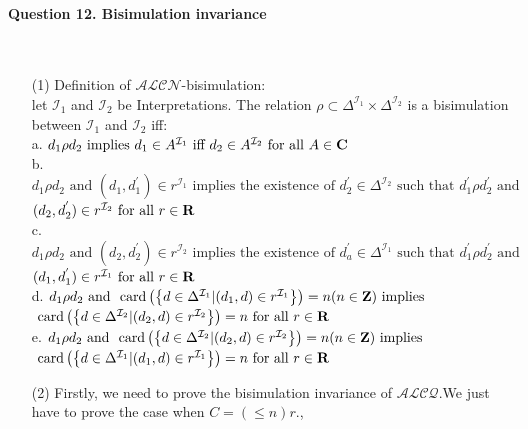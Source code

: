 \documentclass[12pt]{article}
\begin{document}
    \paragraph{Question 12. Bisimulation invariance}~{}
    \\
    
    \begin{enumerate}
        \item[(1)]
        Definition of $\mathcal{ALCN}$-bisimulation: \\
        let $\mathcal{I}_1$ and $\mathcal{I}_2$ be Interpretations. The relation $\rho \subset \Delta^{\mathcal{I}_1}\times \Delta^{\mathcal{I}_2}$ is a bisimulation between $\mathcal{I}_1$ and $\mathcal{I}_2$ iff: \\
        a. $d_1 \rho d_2 \text{ implies } d_1 \in A^{\mathcal{I}_1} \text{ iff } d_2 \in A^{\mathcal{I}_2} \text{ for all } A \in \bold{C}$ \\
        b. $d_1 \rho d_2 \text{ and } (d_1, d_1^{'}) \in r^{\mathcal{I}_1} \text{ implies the existence of } d_2^{'} \in \Delta^{\mathcal{I}_2} \text{ such that } d_1^{'} \rho d_2^{'} \text{ and } $ \\
        $(d_2, d_2^{'})\in r^{\mathcal{I}_2} \text{ for all }r \in \bold{R}$ \\
        c. $d_1 \rho d_2 \text{ and } (d_2, d_2^{'}) \in r^{\mathcal{I}_2} \text{ implies the existence of } d_a^{'} \in \Delta^{\mathcal{I}_1} \text{ such that } d_1^{'} \rho d_2^{'} \text{ and } $ \\
        $(d_1, d_1^{'})\in r^{\mathcal{I}_1} \text{ for all }r \in \bold{R}$ \\
        d. $d_1 \rho d_2 \text{ and } \text{ card} \left(\left\{d \in \Delta ^{\mathcal{I}_1} | (d_1, d) \in r^{\mathcal{I}_1}\right\}\right) = n (n \in \bold{Z})\text{ implies } $ \\
        $\text{ card} \left(\left\{d \in \Delta ^{\mathcal{I}_2} | (d_2, d) \in r^{\mathcal{I}_2}\right\}\right) = n\text{ for all } r\in \bold{R} $ \\
        e. $d_1 \rho d_2 \text{ and } \text{ card} \left(\left\{d \in \Delta ^{\mathcal{I}_2} | (d_2, d) \in r^{\mathcal{I}_2}\right\}\right) = n (n \in \bold{Z})\text{ implies } $ \\
        $\text{ card} \left(\left\{d \in \Delta ^{\mathcal{I}_1} | (d_1, d) \in r^{\mathcal{I}_1}\right\}\right) = n\text{ for all } r\in \bold{R} $ \\
        \item[(2)]
        Firstly, we need to prove the bisimulation invariance of $\mathcal{ALCQ}$.We just have to prove the case when $C = (\leq n)r.$, 

\end{enumerate}
\end{document}
